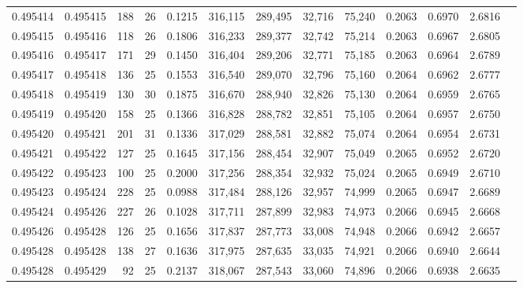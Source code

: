 \begin{tabular}{rrrrrrrrrrrrr}
0.495414 & 0.495415 & 188 &  26 &                                     0.1215 & 316,115 & 289,495 &  32,716 &  75,240 & 0.2063 & 0.6970 & 2.6816 \\
0.495415 & 0.495416 & 118 &  26 &                                     0.1806 & 316,233 & 289,377 &  32,742 &  75,214 & 0.2063 & 0.6967 & 2.6805 \\
0.495416 & 0.495417 & 171 &  29 &                                     0.1450 & 316,404 & 289,206 &  32,771 &  75,185 & 0.2063 & 0.6964 & 2.6789 \\
0.495417 & 0.495418 & 136 &  25 &                                     0.1553 & 316,540 & 289,070 &  32,796 &  75,160 & 0.2064 & 0.6962 & 2.6777 \\
0.495418 & 0.495419 & 130 &  30 &                                     0.1875 & 316,670 & 288,940 &  32,826 &  75,130 & 0.2064 & 0.6959 & 2.6765 \\
0.495419 & 0.495420 & 158 &  25 &                                     0.1366 & 316,828 & 288,782 &  32,851 &  75,105 & 0.2064 & 0.6957 & 2.6750 \\
0.495420 & 0.495421 & 201 &  31 &                                     0.1336 & 317,029 & 288,581 &  32,882 &  75,074 & 0.2064 & 0.6954 & 2.6731 \\
0.495421 & 0.495422 & 127 &  25 &                                     0.1645 & 317,156 & 288,454 &  32,907 &  75,049 & 0.2065 & 0.6952 & 2.6720 \\
0.495422 & 0.495423 & 100 &  25 &                                     0.2000 & 317,256 & 288,354 &  32,932 &  75,024 & 0.2065 & 0.6949 & 2.6710 \\
0.495423 & 0.495424 & 228 &  25 &                                     0.0988 & 317,484 & 288,126 &  32,957 &  74,999 & 0.2065 & 0.6947 & 2.6689 \\
0.495424 & 0.495426 & 227 &  26 &                                     0.1028 & 317,711 & 287,899 &  32,983 &  74,973 & 0.2066 & 0.6945 & 2.6668 \\
0.495426 & 0.495428 & 126 &  25 &                                     0.1656 & 317,837 & 287,773 &  33,008 &  74,948 & 0.2066 & 0.6942 & 2.6657 \\
0.495428 & 0.495428 & 138 &  27 &                                     0.1636 & 317,975 & 287,635 &  33,035 &  74,921 & 0.2066 & 0.6940 & 2.6644 \\
0.495428 & 0.495429 &  92 &  25 &                                     0.2137 & 318,067 & 287,543 &  33,060 &  74,896 & 0.2066 & 0.6938 & 2.6635 \\

\end{tabular}

